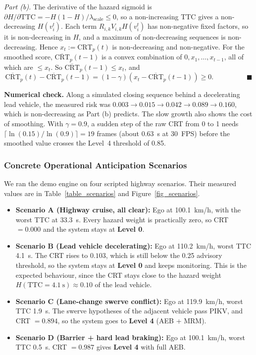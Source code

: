 \documentclass[preprint,12pt]{elsarticle}
\begin{document}
\textit{Part (b).} The derivative of the hazard sigmoid is $\partial H / \partial \text{TTC} = -H(1 - H)/\lambda_{\text{scale}} \le 0$, so a non-increasing TTC gives a non-decreasing $H(v_i^t)$. Each term $R_{i,k} V_{i,k} H(v_i^t)$ has non-negative fixed factors, so it is non-decreasing in $H$, and a maximum of non-decreasing sequences is non-decreasing. Hence $x_t := \text{CRT}_p(t)$ is non-decreasing and non-negative. For the smoothed score, $\overline{\text{CRT}}_p(t-1)$ is a convex combination of $0, x_1, \dots, x_{t-1}$, all of which are $\le x_t$. So $\overline{\text{CRT}}_p(t-1) \le x_t$, and
\begin{equation*}
\overline{\text{CRT}}_p(t) - \overline{\text{CRT}}_p(t-1) = (1 - \gamma)\left(x_t - \overline{\text{CRT}}_p(t-1)\right) \ge 0. \hspace{2cm} \blacksquare
\end{equation*}

\textbf{Numerical check.} Along a simulated closing sequence behind a decelerating lead vehicle, the measured risk was $0.003 \rightarrow 0.015 \rightarrow 0.042 \rightarrow 0.089 \rightarrow 0.160$, which is non-decreasing as Part (b) predicts. The slow growth also shows the cost of smoothing. With $\gamma = 0.9$, a sudden step of the raw CRT from 0 to 1 needs $\lceil \ln(0.15)/\ln(0.9) \rceil = 19$ frames (about 0.63~s at 30~FPS) before the smoothed value crosses the Level~4 threshold of 0.85.

\subsubsection{Concrete Operational Anticipation Scenarios}
We ran the demo engine on four scripted highway scenarios. Their measured values are in Table~\ref{table_scenarios} and Figure~\ref{fig_scenarios}.
\begin{itemize}
    \item \textbf{Scenario A (Highway cruise, all clear):} Ego at 100.1~km/h, with the worst TTC at 33.3~s. Every hazard weight is practically zero, so CRT $= 0.000$ and the system stays at \textbf{Level 0}.
    \item \textbf{Scenario B (Lead vehicle decelerating):} Ego at 110.2~km/h, worst TTC 4.1~s. The CRT rises to $0.103$, which is still below the 0.25 advisory threshold, so the system stays at \textbf{Level 0} and keeps monitoring. This is the expected behaviour, since the CRT stays close to the hazard weight $H(\text{TTC}=4.1~\text{s}) \approx 0.10$ of the lead vehicle.
    \item \textbf{Scenario C (Lane-change swerve conflict):} Ego at 119.9~km/h, worst TTC 1.9~s. The swerve hypotheses of the adjacent vehicle pass PIKV, and CRT $= 0.894$, so the system goes to \textbf{Level 4} (AEB + MRM).
    \item \textbf{Scenario D (Barrier + hard lead braking):} Ego at 100.1~km/h, worst TTC 0.5~s. CRT $= 0.987$ gives \textbf{Level 4} with full AEB.
\end{itemize}
\end{document}
